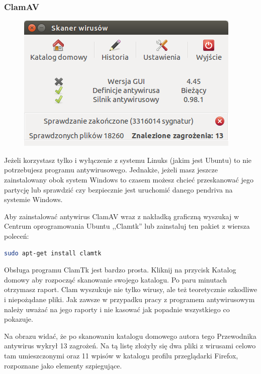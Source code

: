 \subsubsection{ClamAV}
\begin{figure}
	\vspace{-10pt}
	\includegraphics[width=\linewidth]{images/programy_clam.png}
\end{figure}

Jeżeli korzystasz tylko i wyłączenie z systemu Linuks (jakim jest Ubuntu) to nie potrzebujesz programu antywirusowego. Jednakże, jeżeli masz jeszcze zainstalowany obok system Windows to czasem możesz chcieć przeskanować jego partycję lub sprawdzić czy bezpiecznie jest uruchomić danego pendriva na systemie Windows.

Aby zainstalować antywirus \textcolor{ubuntu_orange}{ClamAV} wraz z nakładką graficzną wyszukaj w Centrum oprogramowania Ubuntu ,,Clamtk'' lub zainstaluj ten pakiet z wiersza poleceń:
\begin{lstlisting}[language=bash]
sudo apt-get install clamtk
\end{lstlisting}

Obsługa programu ClamTk jest bardzo prosta. Kliknij na przycisk \textcolor{ubuntu_orange}{Katalog domowy} aby rozpocząć skanowanie swojego katalogu. Po paru minutach otrzymasz raport. Clam wyszukuje nie tylko wirusy, ale też teoretycznie szkodliwe i niepożądane pliki. Jak zawsze w przypadku pracy z programem antywirusowym należy uważać na jego raporty i nie kasować jak popadnie wszystkiego co pokazuje.

Na obrazu widać, że po skanowaniu katalogu domowego autora tego Przewodnika antywirus wykrył 13 zagrożeń. Na tą listę złożyły się dwa pliki z wirusami celowo tam umieszczonymi oraz 11 wpisów w katalogu profilu przeglądarki Firefox, rozpoznane jako elementy szpiegujące.

